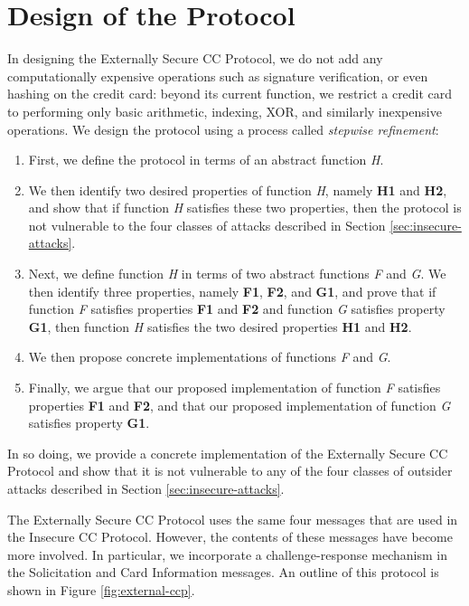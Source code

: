 \section{Design of the Protocol}
\label{sec:external-design}

In designing the Externally Secure CC Protocol, we do not add any computationally expensive operations such as signature verification, or even hashing on the credit card:
    beyond its current function, we restrict a credit card to performing only basic arithmetic, indexing, XOR, and similarly inexpensive operations.
We design the protocol using a process called \emph{stepwise refinement}:
\begin{enumerate}
\item First, we define the protocol in terms of an abstract function \emph{H}.
\item We then identify two desired properties of function \emph{H}, namely \textbf{H1} and \textbf{H2},
	and show that if function \emph{H} satisfies these two properties,
	then the protocol is not vulnerable to the four classes of attacks described in Section \ref{sec:insecure-attacks}.
\item Next, we define function \emph{H} in terms of two abstract functions \emph{F} and \emph{G}.
We then identify three properties, namely \textbf{F1}, \textbf{F2}, and \textbf{G1},
	and prove that if function \emph{F} satisfies properties \textbf{F1} and \textbf{F2}
	and function \emph{G} satisfies property \textbf{G1}, then function \emph{H} satisfies the two desired properties \textbf{H1} and \textbf{H2}.
\item We then propose concrete implementations of functions \emph{F} and \emph{G}.
\item Finally, we argue that our proposed implementation of function \emph{F} satisfies properties \textbf{F1} and \textbf{F2},
	and that our proposed implementation of function \emph{G} satisfies property \textbf{G1}.
\end{enumerate}

In so doing, we provide a concrete implementation of the Externally Secure CC Protocol
	and show that it is not vulnerable to any of the four classes of outsider attacks described in Section \ref{sec:insecure-attacks}.

The Externally Secure CC Protocol uses the same four messages that are used in the Insecure CC Protocol.
However, the contents of these messages have become more involved.
In particular, we incorporate a challenge-response mechanism in the Solicitation and Card Information messages.
An outline of this protocol is shown in Figure \ref{fig:external-ccp}.

